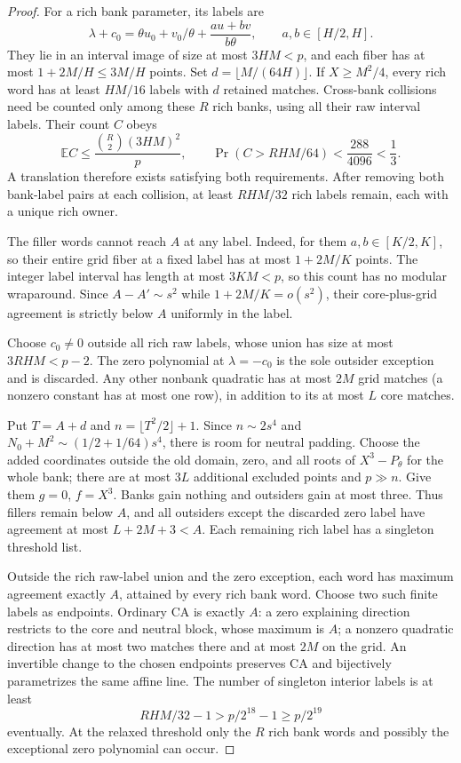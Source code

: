 \begin{proof}
For a rich bank parameter, its labels are
\[
 \lambda+c_0=\theta u_0+v_0/\theta
                   +\frac{au+bv}{b\theta},
 \qquad a,b\in[H/2,H].
\]
They lie in an interval image of size at most $3HM<p$, and each fiber
has at most $1+2M/H\le3M/H$ points.  Set
$d=\lfloor M/(64H)\rfloor$.  If $X\ge M^2/4$, every rich word has
at least $HM/16$ labels with $d$ retained matches.  Cross-bank collisions
need be counted only among these $R$ rich banks, using all their raw
interval labels.  Their count $C$ obeys
\[
 \mathbb E C\le\frac{\binom R2(3HM)^2}{p},\qquad
 \Pr(C>RHM/64)<\frac{288}{4096}<\frac13.
\]
A translation therefore exists satisfying both requirements.  After
removing both bank-label pairs at each collision, at least $RHM/32$
rich labels remain, each with a unique rich owner.

The filler words cannot reach $A$ at any label.  Indeed, for them
$a,b\in[K/2,K]$, so their entire grid fiber at a fixed label has at most
$1+2M/K$ points.  The integer label interval has length at most
$3KM<p$, so this count has no modular wraparound.  Since
$A-A'\sim s^2$ while $1+2M/K=o(s^2)$, their core-plus-grid agreement
is strictly below $A$ uniformly in the label.

Choose $c_0\ne0$ outside all rich raw labels, whose union has size
at most $3RHM<p-2$.  The zero polynomial at $\lambda=-c_0$ is the
sole outsider exception and is discarded.  Any other nonbank quadratic
has at most $2M$ grid matches (a nonzero constant has at most one row),
in addition to its at most $L$ core matches.

Put $T=A+d$ and $n=\lfloor T^2/2\rfloor+1$.
Since $n\sim2s^4$ and $N_0+M^2\sim(1/2+1/64)s^4$, there is room
for neutral padding.  Choose the added coordinates outside the old
domain, zero, and all roots of $X^3-P_\theta$ for the whole bank;
there are at most $3L$ additional excluded points and $p\gg n$.
Give them $g=0$, $f=X^3$.  Banks gain nothing and outsiders gain at
most three.  Thus fillers remain below $A$, and all outsiders except
the discarded zero label have agreement at most $L+2M+3<A$.
Each remaining rich label has a singleton threshold list.

Outside the rich raw-label union and the zero exception, each word
has maximum agreement exactly $A$, attained by every rich bank word.
Choose two such finite labels as endpoints.  Ordinary CA is exactly
$A$: a zero explaining direction restricts to the core and neutral
block, whose maximum is $A$; a nonzero quadratic direction has at most
two matches there and at most $2M$ on the grid.  An invertible change
to the chosen endpoints preserves CA and bijectively parametrizes the
same affine line.  The number of singleton interior labels is at least
\[
 RHM/32-1>p/2^{18}-1\ge p/2^{19}
\]
eventually.  At the relaxed threshold only the $R$ rich bank words
and possibly the exceptional zero polynomial can occur.


\end{proof}
